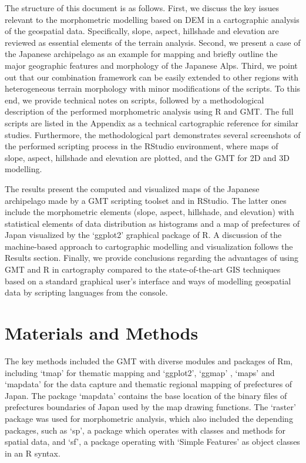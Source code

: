 \documentclass[land,article,accept,pdftex,moreauthors]{Definitions/mdpi}
\begin{document}
The structure of this document is as follows. First, we discuss the key issues relevant to the morphometric modelling based on DEM in a cartographic analysis of the geospatial data. Specifically, slope, aspect, hillshade and elevation are reviewed as essential elements of the terrain analysis. Second, we present a case of the Japanese archipelago as an example for mapping and briefly outline the major geographic features and morphology of the Japanese Alps. Third, we point out that our combination framework can be easily extended to other regions with heterogeneous terrain morphology with minor modifications of the scripts. To this end, we provide technical notes on scripts, followed by a methodological description of the performed morphometric analysis using R and GMT. The full scripts are listed in the Appendix as a technical cartographic reference for similar studies. Furthermore, the methodological part demonstrates several screenshots of the performed scripting process in the RStudio environment, where maps of slope, aspect, hillshade and elevation are plotted, and the GMT for 2D and 3D modelling. 

The results present the computed and visualized maps of the Japanese archipelago made by a GMT scripting toolset and in RStudio. The latter ones include the morphometric elements (slope, aspect, hillshade, and elevation) with statistical elements of data distribution as histograms and a map of prefectures of Japan visualized by the ‘ggplot2’ graphical package of R. A discussion of the machine-based approach to cartographic modelling and visualization follows the Results section. Finally, we provide conclusions regarding the advantages of using GMT and R in cartography compared to the state-of-the-art GIS techniques based on a standard graphical user's interface and ways of modelling geospatial data by scripting languages from the console. 

\section{Materials and Methods}
The key methods included the GMT with diverse modules and packages of Rm, including ‘tmap’ for thematic mapping and ‘ggplot2’, ‘ggmap’ \cite{KahleWickham}, ‘maps’ and ‘mapdata’ for the data capture and thematic regional mapping of prefectures of Japan. The package ‘mapdata’ contains the base location of the binary files of prefectures boundaries of Japan used by the map drawing functions. The ‘raster’ package was used for morphometric analysis, which also included the depending packages, such as ‘sp’, a package which operates with classes and methods for spatial data, and ‘sf’, a package operating with ‘Simple Features’ as object classes in an R syntax. 
\end{document}
